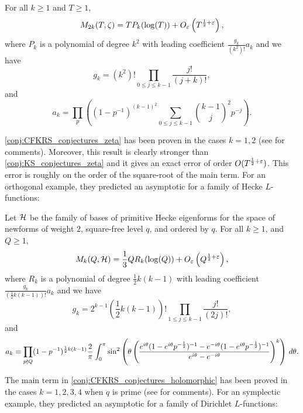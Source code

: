   \begin{conjecture}\label{conj:CFKRS_conjectures_zeta}
    For all $k \ge 1$ and $T \ge 1$,
    \[
      M_{2k}(T,\zeta) = TP_{k}(\log(T))+O_{\varepsilon}\left(T^{\frac{1}{2}+\varepsilon}\right),
    \]
    where $P_{k}$ is a polynomial of degree $k^{2}$ with leading coefficient $\frac{g_{k}}{(k^{2})!}a_{k}$ and we have
    \[
      g_{k} = (k^{2})!\prod_{0 \le j \le k-1}\frac{j!}{(j+k)!},
    \]
    and
    \[
      a_{k} = \prod_{p}\left((1-p^{-1})^{(k-1)^{2}}\sum_{0 \le j \le k-1}\binom{k-1}{j}^{2}p^{-j}\right).
    \]
  \end{conjecture}

  \cref{conj:CFKRS_conjectures_zeta} has been proven in the cases $k = 1,2$ (see \cite{conrey2005integral} for comments). Moreover, this result is clearly stronger than \cref{conj:KS_conjectures_zeta} and it gives an exact error of order $O(T^{\frac{1}{2}+\varepsilon})$. This error is roughly on the order of the square-root of the main term. For an orthogonal example, they predicted an asymptotic for a family of Hecke $L$-functions:

  \begin{conjecture}\label{conj:CFKRS_conjectures_holomorphic}
    Let $\mathcal{H}$ be the family of bases of primitive Hecke eigenforms for the space of newforms of weight $2$, square-free level $q$, and ordered by $q$. For all $k \ge 1$, and $Q \ge 1$,
    \[
      M_{k}(Q,\mathcal{H}) = \frac{1}{3}QR_{k}(\log(Q))+O_{\varepsilon}\left(Q^{\frac{1}{2}+\varepsilon}\right),
    \]
    where $R_{k}$ is a polynomial of degree $\frac{1}{2}k(k-1)$ with leading coefficient $\frac{g_{k}}{\left(\frac{1}{2}k(k-1)\right)!}a_{k}$ and we have
    \[
      g_{k} = 2^{k-1}\left(\frac{1}{2}k(k-1)\right)!\prod_{1 \le j \le k-1}\frac{j!}{(2j)!},
    \]
    and
    \[
      a_{k} = \prod_{p \nmid Q}(1-p^{-1})^{\frac{1}{2}k(k-1)}\frac{2}{\pi}\int_{0}^{\pi}\sin^{2}\left(\theta\left(\frac{e^{i\theta}(1-e^{i\theta}p^{-\frac{1}{2}})^{-1}-e^{-i\theta}(1-e^{i\theta}p^{-\frac{1}{2}})^{-1}}{e^{i\theta}-e^{-i\theta}}\right)^{k}\right)\,d\theta.
    \]
  \end{conjecture}

  The main term in \cref{conj:CFKRS_conjectures_holomorphic} has been proved in the cases $k = 1,2,3,4$ when $q$ is prime (see \cite{conrey2005integral} for comments). For an symplectic example, they predicted an asymptotic for a family of Dirichlet $L$-functions:


